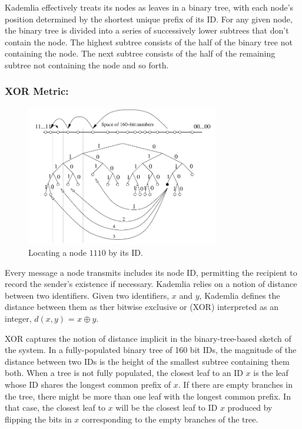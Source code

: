 \documentclass[a4paper,12pt]{article}
\begin{document}
Kademlia effectively treats its nodes as leaves in a binary tree, with each node's position determined by the shortest unique prefix of its ID. For any given node, the binary tree is divided into a series of successively lower subtrees that don't contain the node. The highest subtree consists of the half of the binary tree not containing the node. The next subtree consists of the half of the remaining subtree not containing the node and so forth.

\subsubsection{XOR Metric:}

\begin{figure}[H]
\centering
\includegraphics[width=0.75\textwidth]{./img/kadem-2.png}
\caption{\label{fig:kadem-2} Locating a node $1110$ by its ID.}
\end{figure}

Every message a node transmits includes its node ID, permitting the recipient to record the sender's existence if necessary. Kademlia relies on a notion of distance between two identifiers. Given two identifiers, $x$ and $y$, Kademlia defines the distance between them as ther bitwise exclusive or (XOR) interpreted as an integer, $d(x,y)$ = $x \oplus y$.

XOR captures the notion of distance implicit in the binary-tree-based sketch of the system. In a fully-populated binary tree of 160 bit IDs, the magnitude of the distance between two IDs is the height of the smallest subtree containing them both. When a tree is not fully populated, the closest leaf to an ID $x$ is the leaf whose ID shares the longest common prefix of $x$. If there are empty branches in the tree, there might be more than one leaf with the longest common prefix. In that case, the closest leaf to $x$ will be the closest leaf to ID $x$ produced by flipping the bits in $x$ corresponding to the empty branches of the tree.
\end{document}
